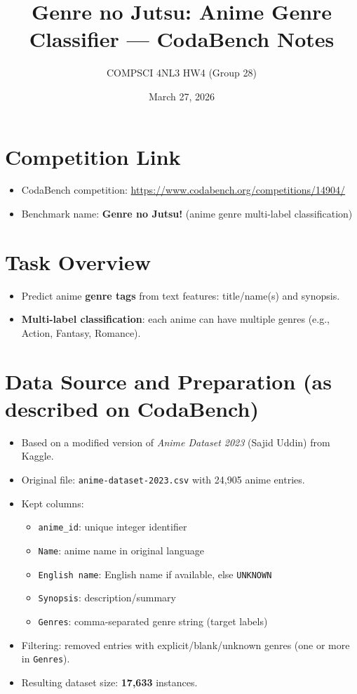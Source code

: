 \documentclass[11pt]{article}
\title{Genre no Jutsu: Anime Genre Classifier --- CodaBench Notes}
\author{COMPSCI 4NL3 HW4 (Group 28)}
\date{March 27, 2026}
\begin{document}
\maketitle

\section{Competition Link}
\begin{itemize}[leftmargin=*]
  \item CodaBench competition: \url{https://www.codabench.org/competitions/14904/}
  \item Benchmark name: \textbf{Genre no Jutsu!} (anime genre multi-label classification)
\end{itemize}

\section{Task Overview}
\begin{itemize}[leftmargin=*]
  \item Predict anime \textbf{genre tags} from text features: title/name(s) and synopsis.
  \item \textbf{Multi-label classification}: each anime can have multiple genres (e.g., Action, Fantasy, Romance).
\end{itemize}

\section{Data Source and Preparation (as described on CodaBench)}
\begin{itemize}[leftmargin=*]
  \item Based on a modified version of \emph{Anime Dataset 2023} (Sajid Uddin) from Kaggle.
  \item Original file: \texttt{anime-dataset-2023.csv} with 24{,}905 anime entries.
  \item Kept columns:
  \begin{itemize}
    \item \texttt{anime\_id}: unique integer identifier
    \item \texttt{Name}: anime name in original language
    \item \texttt{English name}: English name if available, else \texttt{UNKNOWN}
    \item \texttt{Synopsis}: description/summary
    \item \texttt{Genres}: comma-separated genre string (target labels)
  \end{itemize}
  \item Filtering: removed entries with explicit/blank/unknown genres (one or more in \texttt{Genres}).
  \item Resulting dataset size: \textbf{17{,}633} instances.
\end{itemize}
\end{document}

